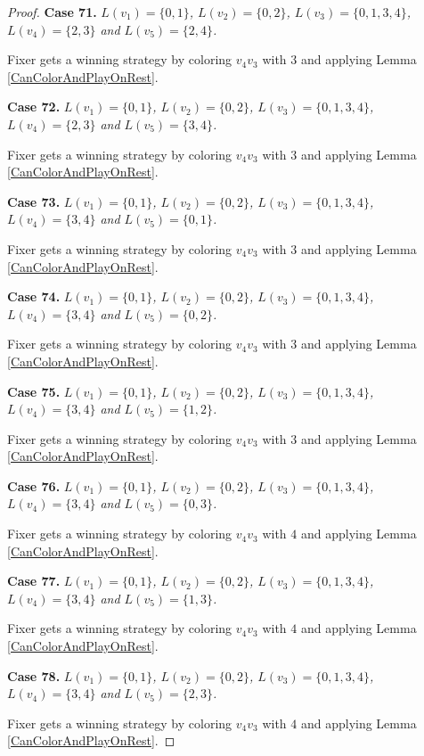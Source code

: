 \documentclass[12pt]{amsart}
\theoremstyle{plain}
\theoremstyle{definition}
\theoremstyle{remark}
\begin{document}
\begin{proof}
\noindent\textbf{Case 71.  }\textit{$L(v_1) = \{0, 1\}$, $L(v_2) = \{0, 2\}$, $L(v_3) = \{0, 1, 3, 4\}$, $L(v_4) = \{2, 3\}$ and $L(v_5) = \{2, 4\}$.}

Fixer gets a winning strategy by coloring $v_4v_3$ with $3$ and applying Lemma \ref{CanColorAndPlayOnRest}.

\noindent\textbf{Case 72.  }\textit{$L(v_1) = \{0, 1\}$, $L(v_2) = \{0, 2\}$, $L(v_3) = \{0, 1, 3, 4\}$, $L(v_4) = \{2, 3\}$ and $L(v_5) = \{3, 4\}$.}

Fixer gets a winning strategy by coloring $v_4v_3$ with $3$ and applying Lemma \ref{CanColorAndPlayOnRest}.

\noindent\textbf{Case 73.  }\textit{$L(v_1) = \{0, 1\}$, $L(v_2) = \{0, 2\}$, $L(v_3) = \{0, 1, 3, 4\}$, $L(v_4) = \{3, 4\}$ and $L(v_5) = \{0, 1\}$.}

Fixer gets a winning strategy by coloring $v_4v_3$ with $3$ and applying Lemma \ref{CanColorAndPlayOnRest}.

\noindent\textbf{Case 74.  }\textit{$L(v_1) = \{0, 1\}$, $L(v_2) = \{0, 2\}$, $L(v_3) = \{0, 1, 3, 4\}$, $L(v_4) = \{3, 4\}$ and $L(v_5) = \{0, 2\}$.}

Fixer gets a winning strategy by coloring $v_4v_3$ with $3$ and applying Lemma \ref{CanColorAndPlayOnRest}.

\noindent\textbf{Case 75.  }\textit{$L(v_1) = \{0, 1\}$, $L(v_2) = \{0, 2\}$, $L(v_3) = \{0, 1, 3, 4\}$, $L(v_4) = \{3, 4\}$ and $L(v_5) = \{1, 2\}$.}

Fixer gets a winning strategy by coloring $v_4v_3$ with $3$ and applying Lemma \ref{CanColorAndPlayOnRest}.

\noindent\textbf{Case 76.  }\textit{$L(v_1) = \{0, 1\}$, $L(v_2) = \{0, 2\}$, $L(v_3) = \{0, 1, 3, 4\}$, $L(v_4) = \{3, 4\}$ and $L(v_5) = \{0, 3\}$.}

Fixer gets a winning strategy by coloring $v_4v_3$ with $4$ and applying Lemma \ref{CanColorAndPlayOnRest}.

\noindent\textbf{Case 77.  }\textit{$L(v_1) = \{0, 1\}$, $L(v_2) = \{0, 2\}$, $L(v_3) = \{0, 1, 3, 4\}$, $L(v_4) = \{3, 4\}$ and $L(v_5) = \{1, 3\}$.}

Fixer gets a winning strategy by coloring $v_4v_3$ with $4$ and applying Lemma \ref{CanColorAndPlayOnRest}.

\noindent\textbf{Case 78.  }\textit{$L(v_1) = \{0, 1\}$, $L(v_2) = \{0, 2\}$, $L(v_3) = \{0, 1, 3, 4\}$, $L(v_4) = \{3, 4\}$ and $L(v_5) = \{2, 3\}$.}

Fixer gets a winning strategy by coloring $v_4v_3$ with $4$ and applying Lemma \ref{CanColorAndPlayOnRest}.


\end{proof}
\end{document}
